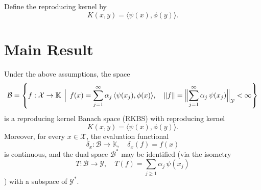 Define the reproducing kernel by
\[
K(x,y)= \langle \psi(x), \phi(y)\rangle.
\]

\section*{Main Result}

\begin{theorem}
Under the above assumptions, the space
\[
\mathcal{B} = \left\{ f:\mathcal{X}\to \mathbb{K}\,\Bigm|\, f(x)= \sum_{j=1}^\infty \alpha_j\, \langle \psi(x_j), \phi(x)\rangle,\quad \|f\| = \Bigl\|\sum_{j=1}^\infty \alpha_j\, \psi(x_j)\Bigr\|_{\mathcal{Y}} < \infty \right\}
\]
is a reproducing kernel Banach space (RKBS) with reproducing kernel
\[
K(x,y)= \langle \psi(x), \phi(y)\rangle.
\]
Moreover, for every $x\in\mathcal{X}$, the evaluation functional
\[
\delta_x: \mathcal{B}\to \mathbb{K},\quad \delta_x(f)= f(x)
\]
is continuous, and the dual space $\mathcal{B}^*$ may be identified (via the isometry 
\[
T: \mathcal{B}\to \mathcal{Y},\quad T(f)= \sum_{j\ge1}\alpha_j\,\psi(x_j)
\]
) with a subspace of $\mathcal{Y}^*$.
\end{theorem}

